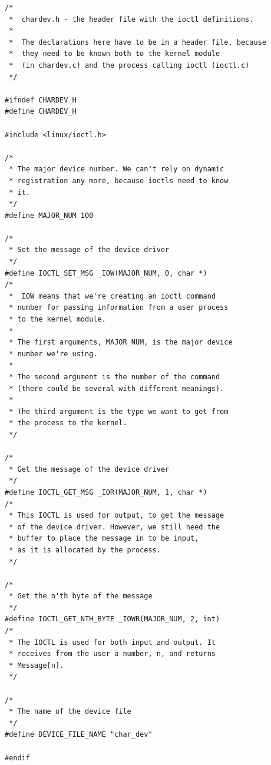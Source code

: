 \documentclass[11pt]{article}
\begin{document}
\begin{verbatim}
/*
 *  chardev.h - the header file with the ioctl definitions.
 *
 *  The declarations here have to be in a header file, because
 *  they need to be known both to the kernel module
 *  (in chardev.c) and the process calling ioctl (ioctl.c)
 */

#ifndef CHARDEV_H
#define CHARDEV_H

#include <linux/ioctl.h>

/*
 * The major device number. We can't rely on dynamic
 * registration any more, because ioctls need to know
 * it.
 */
#define MAJOR_NUM 100

/*
 * Set the message of the device driver
 */
#define IOCTL_SET_MSG _IOW(MAJOR_NUM, 0, char *)
/*
 * _IOW means that we're creating an ioctl command
 * number for passing information from a user process
 * to the kernel module.
 *
 * The first arguments, MAJOR_NUM, is the major device
 * number we're using.
 *
 * The second argument is the number of the command
 * (there could be several with different meanings).
 *
 * The third argument is the type we want to get from
 * the process to the kernel.
 */

/*
 * Get the message of the device driver
 */
#define IOCTL_GET_MSG _IOR(MAJOR_NUM, 1, char *)
/*
 * This IOCTL is used for output, to get the message
 * of the device driver. However, we still need the
 * buffer to place the message in to be input,
 * as it is allocated by the process.
 */

/*
 * Get the n'th byte of the message
 */
#define IOCTL_GET_NTH_BYTE _IOWR(MAJOR_NUM, 2, int)
/*
 * The IOCTL is used for both input and output. It
 * receives from the user a number, n, and returns
 * Message[n].
 */

/*
 * The name of the device file
 */
#define DEVICE_FILE_NAME "char_dev"

#endif
\end{verbatim}
\end{document}
